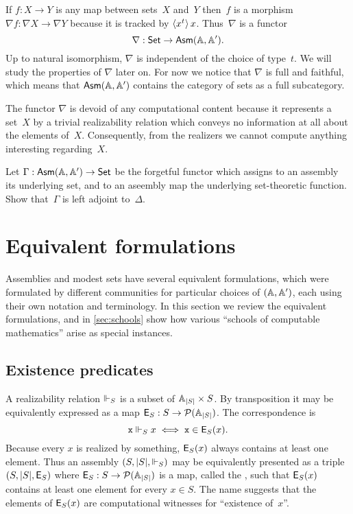 If $f : X \to Y$ is any map between sets~$X$ and~$Y$ then~$f$ is a morphism $\nabla f : \nabla X \to \nabla Y$ because it is tracked by $\langle x^{t} \rangle\,{x}$. Thus~$\nabla$ is a functor
%
\begin{equation*}
  \nabla : \mathsf{Set} \to \mathsf{Asm}(\mathbb{A},\mathbb{A}').
\end{equation*}
%
Up to natural isomorphism, $\nabla$ is independent of the choice of
type~$t$. We will study the properties of $\nabla$ later on. For now
we notice that $\nabla$ is full and faithful, which means that
$\mathsf{Asm}(\mathbb{A},\mathbb{A}')$ contains the category of sets as a full
subcategory.

The functor $\nabla$ is devoid of any computational content because it
represents a set~$X$ by a trivial realizability relation which conveys
no information at all about the elements of~$X$. Consequently, from
the realizers we cannot compute anything interesting regarding~$X$.

\begin{exercise}
  Let $\Gamma : \mathsf{Asm}(\mathbb{A},\mathbb{A}') \to \mathsf{Set}$ be the forgetful functor which assigns to an assembly its underlying set, and to an
  aseembly map the underlying set-theoretic function. Show that~$\Gamma$ is left adjoint to~$\Delta$.
\end{exercise}

\section{Equivalent formulations}
\label{sec:equivalent-formulations}

Assemblies and modest sets have several equivalent formulations, which were formulated by different communities for particular choices of $(\mathbb{A}, \mathbb{A}')$, each using their own notation and terminology. In this section we review the equivalent formulations, and in \cref{sec:schools} show how various ``schools of computable mathematics'' arise as special instances.

\subsection{Existence predicates}
\label{sec:existence-predicates}

A realizability relation $\Vdash_S$ is a subset of $\mathbb{A}_{|S|} \times S$. By transposition it may be equivalently expressed
as a map $\mathsf{E}_S : S \to \mathcal{P}(\mathbb{A}_{|S|})$. The correspondence is
%
\begin{equation*}
  \mathtt{x} \Vdash_S x \iff \mathtt{x} \in \mathsf{E}_S(x).
\end{equation*}
%
Because every $x$ is realized by something, $\mathsf{E}_S(x)$ always contains at least one element. Thus an assembly $(S, |S|, {\Vdash_{S}})$ may be equivalently presented as a triple $(S, |S|, \mathsf{E}_S)$ where $\mathsf{E}_S : S \to \mathcal{P}(\mathbb{A}_{|S|})$ is a map, called the , such that $\mathsf{E}_S(x)$ contains at least one element for every $x \in S$. The name suggests that the elements of $\mathsf{E}_S(x)$ are computational witnesses for ``existence of~$x$''.

